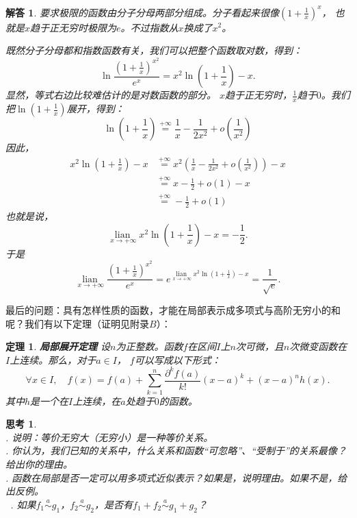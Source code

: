 \documentclass[12pt,UTF8]{ctexbook}
\newcommand{\lian}[1]{
    \underset{#1}{\operatorname{lian}\,}
}
\newcommand{\oveq}[1]{\overset{#1}{=}}
\newcommand{\olim}[1]{\mathit{o}\left(#1\right)}  %
\newcommand{\eqlim}[1]{\overset{#1}{\sim}}  %
\newtheorem{tm}{定理}[section]
\newtheorem{sk}{思考}[section]
\newtheorem*{so}{解答}
\begin{document}
\begin{so}
    要求极限的函数由分子分母两部分组成。分子看起来很像$\left(1 + \frac{1}{x}\right)^{x}$，
    也就是$x$趋于正无穷时极限为$e$。不过指数从$x$换成了$x^2$。

    既然分子分母都和指数函数有关，我们可以把整个函数取对数，得到：
    $$ \ln{\frac{\left(1 + \frac{1}{x}\right)^{x^2}}{e^x}} = x^2 \ln{\left(1 + \frac{1}{x}\right)} - x.$$
    显然，等式右边比较难估计的是对数函数的部分。
    $x$趋于正无穷时，$\frac{1}{x}$趋于$0$。我们把$\ln{\left(1 + \frac{1}{x}\right)}$展开，得到：
    $$ \ln{\left(1 + \frac{1}{x}\right)} \oveq{+\infty} \frac{1}{x} - \frac{1}{2x^2} + \olim{\frac{1}{x^2}}$$
    因此，
    \begin{align*}
        x^2 \ln{\left(1 + \frac{1}{x}\right)} - x &\oveq{+\infty} x^2 \left(\frac{1}{x} - \frac{1}{2x^2} + \olim{\frac{1}{x^2}}\right) - x  \\
        &\oveq{+\infty} x -\frac{1}{2} + \olim{1} - x  \\
        &\oveq{+\infty} -\frac{1}{2} + \olim{1} 
    \end{align*}
    也就是说，
    $$ \lian{x\to +\infty} x^2 \ln{\left(1 + \frac{1}{x}\right)} - x = -\frac{1}{2}. $$
    于是
    $$ \lian{x\to +\infty} \frac{\left(1 + \frac{1}{x}\right)^{x^2}}{e^x} = e^{\lian{x\to +\infty}  x^2 \ln{\left(1 + \frac{1}{x}\right)} - x} = \frac{1}{\sqrt{e}}. $$
\end{so}

最后的问题：具有怎样性质的函数，才能在局部表示成多项式与高阶无穷小的和呢？我们有以下定理（证明见附录$B$）：
\begin{tm}{\textbf{局部展开定理}}
    设$n$为正整数。函数$f$在区间$I$上$n$次可微，且$n$次微变函数在$I$上连续。那么，对于$a\in I$，
    $f$可以写成以下形式：
    $$ \forall x \in I , \quad f(x) = f(a) + \sum_{k=1}^n \frac{\partial^k f (a)}{k!}(x - a)^k + (x - a)^n h(x). $$
    其中$h$是一个在$I$上连续，在$a$处趋于$0$的函数。
\end{tm}

\begin{sk}
    \mbox{} \\
    . 说明：等价无穷大（无穷小）是一种等价关系。\\
    . 你认为，我们已知的关系中，什么关系和函数“可忽略”、“受制于”的关系最像？给出你的理由。\\
    . 函数在局部是否一定可以用多项式近似表示？如果是，说明理由。如果不是，给出反例。\\\
    . 如果$f_1 \eqlim{a} g_1$，$f_2\eqlim{a} g_2$，是否有$f_1 + f_2\eqlim{a} g_1 + g_2$？
\end{sk}
\end{document}
